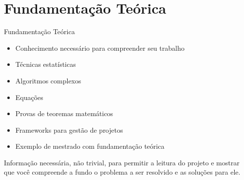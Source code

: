 \section{Fundamentação Teórica}

\begin{frame}	
	\begin{block}{Fundamentação Teórica}
		 \begin{itemize}
			  \item Conhecimento necessário para compreender seu trabalho
			  \item Técnicas estatísticas
			  \item Algoritmos complexos
			  \item Equações
			  \item Provas de teoremas matemáticos
			  \item Frameworks para gestão de projetos
			  \item Exemplo de mestrado com fundamentação teórica \href{http://www.teses.usp.br/teses/disponiveis/100/100131/tde-19042016-140611/pt-br.php}{\color{blue}{Mestrado}} \cite{KHOURI_2016}
		  \end{itemize}
	\end{block}
	
Informação necessária, não trivial, para permitir a leitura do projeto e mostrar que você compreende a fundo o problema a ser resolvido e as soluções para ele.
\end{frame}
